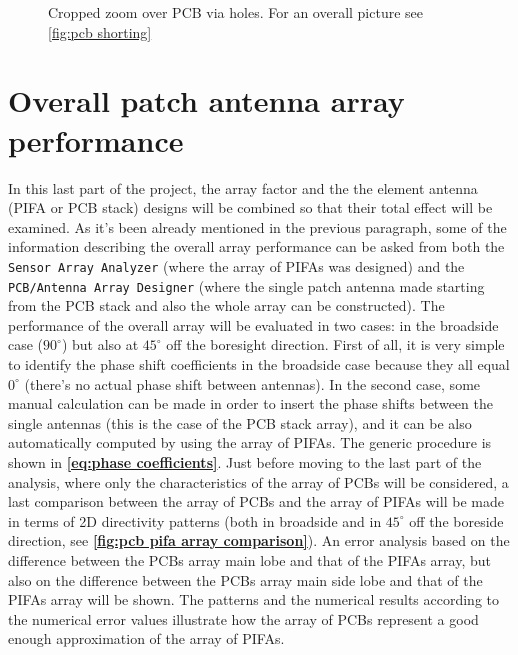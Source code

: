 \documentclass[10pt,a4paper,twocolumn]{article}
\begin{document}
{\begin{figure}[bt!]
		\def\svgwidth{\linewidth}
		\tiny{}
	\caption{Cropped zoom over PCB via holes. For an overall picture see \cref{fig:pcb shorting}}
	\label{fig:pcb shorting zoom}
\end{figure}






\section*{Overall patch antenna array performance}
In this last part of the project, the array factor and the the element antenna (PIFA or PCB stack) designs will be combined so that their total effect will be examined. As it's been already mentioned in the previous paragraph, some of the information describing the overall array performance can be asked from both the \texttt{\color{Mahogany}Sensor Array Analyzer} (where the array of PIFAs was designed) and the \texttt{\color{Mahogany}PCB/Antenna Array Designer} (where the single patch antenna made starting from the PCB stack and also the whole array can be constructed). The performance of the overall array will be evaluated in two cases: in the broadside case ($90^\circ$) but also at $45^\circ$ off the boresight direction. First of all, it is very simple to identify the phase shift coefficients in the broadside case because they all equal $0^\circ$ (there's no actual phase shift between antennas). In the second case, some manual calculation can be made in order to insert the phase shifts between the single antennas (this is the case of the PCB stack array), and it can be also automatically computed by using the array of PIFAs. The generic procedure is shown in \textbf{\cref{eq:phase coefficients}}. Just before moving to the last part of the analysis, where only the characteristics of the array of PCBs will be considered, a last comparison between the array of PCBs and the array of PIFAs will be made in terms of 2D directivity patterns (both in broadside and in $45^\circ$ off the boreside direction, see \textbf{\cref{fig:pcb pifa array comparison}}). An error analysis based on the difference between the PCBs array main lobe and that of the PIFAs array, but also on the difference between the PCBs array main side lobe and that of the PIFAs array will be shown. The patterns and the numerical results according to the numerical error values illustrate how the array of PCBs represent a good enough approximation of the array of PIFAs. 

}
\end{document}
